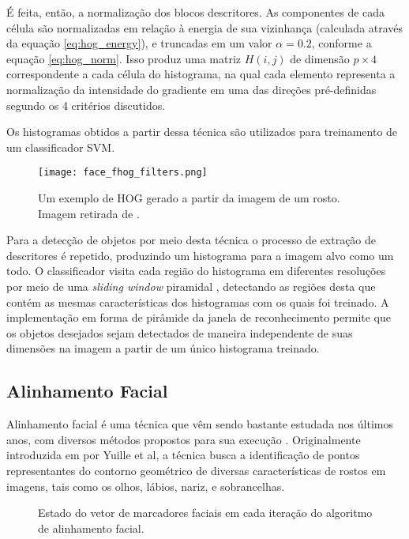 É feita, então, a normalização dos blocos descritores.
As componentes de cada célula são normalizadas em relação à energia de sua vizinhança (calculada através da equação \ref{eq:hog_energy}), e truncadas em um valor $\alpha=0.2$, conforme a equação \ref{eq:hog_norm}.
Isso produz uma matriz $H(i,j)$ de dimensão $p\times4$ correspondente a cada célula do histograma, na qual cada elemento representa a normalização da intensidade do gradiente em uma das direções pré-definidas segundo os 4 critérios discutidos.

Os histogramas obtidos a partir dessa técnica são utilizados para treinamento de um classificador SVM.

\begin{figure}[ht]
    \centering
    \texttt{[image: face\_fhog\_filters.png]}
    \caption{Um exemplo de HOG gerado a partir da imagem de um rosto. Imagem retirada de \cite{kingDlib18Released}.}
    \label{fig:dlib_hog}
\end{figure}

Para a detecção de objetos por meio desta técnica o processo de extração de descritores é repetido, produzindo um histograma para a imagem alvo como um todo.
O classificador visita cada região do histograma em diferentes resoluções por meio de uma \textit{sliding window} piramidal \cite{dalalHistogramsOrientedGradients2005}, detectando as regiões desta que contém as mesmas características dos histogramas com os quais foi treinado.
A implementação em forma de pirâmide da janela de reconhecimento permite que os objetos desejados sejam detectados de maneira independente de suas dimensões na imagem a partir de um único histograma treinado.

\subsection{Alinhamento Facial}
\label{sec:faciallm}

Alinhamento facial é uma técnica que vêm sendo bastante estudada nos últimos anos, com diversos métodos propostos para sua execução \cite{caoFaceAlignmentExplicit2014, liangFaceAlignmentComponentBased2008, dantoneRealtimeFacialFeature2012, xiangxinzhuFaceDetectionPose2012}.
Originalmente introduzida em \cite{yuilleFeatureExtractionFaces1992} por Yuille et al, a técnica busca a identificação de pontos representantes do contorno geométrico de diversas características de rostos em imagens, tais como os olhos, lábios, nariz, e sobrancelhas.

\begin{figure}[ht]
    \centering
    
    \caption{Estado do vetor de marcadores faciais em cada iteração do algoritmo de alinhamento facial.}
    \label{fig:faciallm_iters}
\end{figure}

